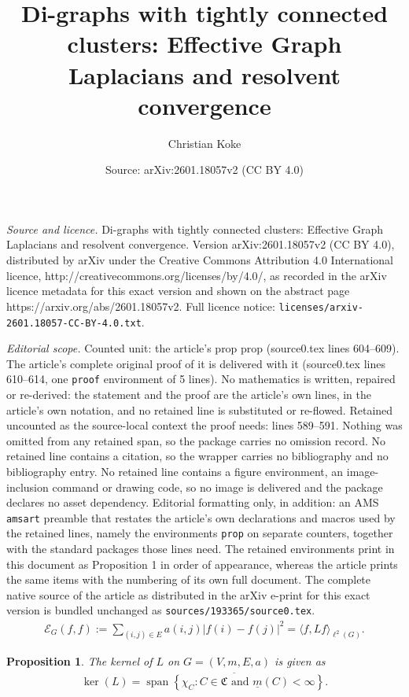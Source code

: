 \documentclass[10pt,a4paper]{amsart}
\title{Di-graphs with tightly connected clusters: Effective Graph Laplacians and resolvent convergence}
\author{Christian Koke}
\date{Source: arXiv:2601.18057v2 (CC BY 4.0)}
\newtheorem{prop}{Proposition}
\begin{document}
\maketitle

\noindent\emph{Source and licence.} Di-graphs with tightly connected clusters: Effective Graph Laplacians and resolvent convergence. Version arXiv:2601.18057v2 (CC BY 4.0), distributed by arXiv under the Creative Commons Attribution 4.0 International licence, http://creativecommons.org/licenses/by/4.0/, as recorded in the arXiv licence metadata for this exact version and shown on the abstract page https://arxiv.org/abs/2601.18057v2. Full licence notice: \texttt{licenses/arxiv-2601.18057-CC-BY-4.0.txt}.\par\smallskip

\noindent\textit{Editorial scope.} Counted unit: the article's prop prop (source0.tex lines 604--609). The article's complete original proof of it is delivered with it (source0.tex lines 610--614, one \texttt{proof} environment of 5 lines). No mathematics is written, repaired or re-derived: the statement and the proof are the article's own lines, in the article's own notation, and no retained line is substituted or re-flowed.  Retained uncounted as the source-local context the proof needs: lines 589--591.  Nothing was omitted from any retained span, so the package carries no omission record.  No retained line contains a citation, so the wrapper carries no bibliography and no bibliography entry.  No retained line contains a figure environment, an image-inclusion command or drawing code, so no image is delivered and the package declares no asset dependency.  Editorial formatting only, in addition: an AMS \texttt{amsart} preamble that restates the article's own declarations and macros used by the retained lines, namely the environments \texttt{prop} on separate counters, together with the standard packages those lines need.  The retained environments print in this document as Proposition 1 in order of appearance, whereas the article prints the same items with the numbering of its own full document.  The complete native source of the article as distributed in the arXiv e-print for this exact version is bundled unchanged as \texttt{sources/193365/source0.tex}.
	\begin{align}\label{dirichlet_form}
		\mathcal{E}_G(f,f) :=  \sum\limits_{(i,j) \in E} a(i,j) |f(i) - f(j)|^2 = \langle f, L f\rangle_{\ell^2(G)}.
	\end{align}

\begin{prop}
	The kernel of $L$ on $G = (V, m, E, a)$ is given as 
	\begin{align}
	\ker(L) = \overline{\operatorname{span} \left\{ \chi_C : C \in \mathfrak{C} \text{ and } \underline{m}(C) < \infty \right\}}.
	\end{align}
\end{prop}
\end{document}
